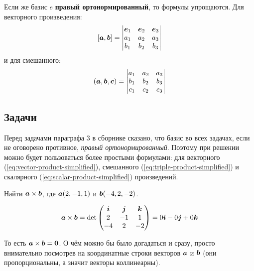 \documentclass[a4paper,12pt]{article}
\begin{document}
  Если же базис $e$ \textbf{правый ортонормированный}, то формулы упрощаются.
  Для векторного произведения:
  \begin{equation}\label{eq:vector-product-simplified}
    [\boldsymbol a, \boldsymbol b] = \begin{vmatrix}
      \boldsymbol e_1 & \boldsymbol e_2 & \boldsymbol e_3\\
      a_1 & a_2 & a_3\\
      b_1 & b_2 & b_3
    \end{vmatrix}
  \end{equation}
  и для смешанного:
  \begin{equation}\label{eq:triple-product-simplified}
    (\boldsymbol a, \boldsymbol b, \boldsymbol c) = \begin{vmatrix}
      a_1 & a_2 & a_3\\
      b_1 & b_2 & b_3\\
      c_1 & c_2 & c_3
    \end{vmatrix}
  \end{equation}
  
  
  \subsection{Задачи}
  
  Перед задачами параграфа $3$ в сборнике сказано, что базис во всех задачах, если не оговорено противное, \emph{правый ортонормированный}.
  Поэтому при решении можно будет пользоваться более простыми формулами: для векторного (\ref{eq:vector-product-simplified}), смешанного (\ref{eq:triple-product-simplified}) и скалярного (\ref{eq:scalar-product-simplified}) произведений.
  
  
  \begin{problem}[3.1(2)]
    Найти $\boldsymbol a \times \boldsymbol b$, где $\boldsymbol a(2, -1, 1)$ и $\boldsymbol b(-4, 2, -2)$.  %
  \end{problem}
  
  \begin{solution}
    \[
      \boldsymbol a \times \boldsymbol b = \det \begin{pmatrix}
        \boldsymbol i & \boldsymbol j & \boldsymbol k\\
        2      & -1     & 1\\
        -4     & 2      & -2
      \end{pmatrix}
      = 0 \boldsymbol i - 0 \boldsymbol j + 0 \boldsymbol k
    \]
    
    То есть $\bds a \hm\times \bds b \hm= \bds 0$.
    О чём можно бы было догадаться и сразу, просто внимательно посмотрев на координатные строки векторов $\boldsymbol a$ и $\boldsymbol b$ (они пропорциональны, а значит векторы коллинеарны).
  \end{solution}
  
\end{document}
